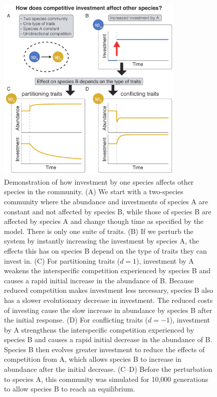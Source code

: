 \documentclass[11pt]{article}
\begin{document}
\begin{figure}[ht!]
\centering
\includegraphics[width=0.8\textwidth,keepaspectratio]{1-diagram.pdf}
\caption{Demonstration of how investment by one species affects other species in the community. (A) We start with a two-species community where the abundance and investments of species A are constant and not affected by species B, while those of species B are affected by species A and change though time as specified by the model. There is only one suite of traits. (B) If we perturb the system by instantly increasing the investment by species A, the effects this has on species B depend on the type of traits they can invest in. (C) For partitioning traits ($d = 1$), investment by A weakens the interspecific competition experienced by species B and causes a rapid initial increase in the abundance of B. Because reduced competition makes investment less necessary, species B also has a slower evolutionary decrease in investment. The reduced costs of investing cause the slow increase in abundance by species B after the initial response. (D) For conflicting traits ($d = -1$), investment by A strengthens the interspecific competition experienced by species B and causes a rapid initial decrease in the abundance of B. Species B then evolves greater investment to reduce the effects of competition from A, which allows species B to increase in abundance after the initial decrease. (C–D) Before the perturbation to species A, this community was simulated for 10,000 generations to allow species B to reach an equilibrium.}
\label{fig:model-description}
\end{figure}
\end{document}
